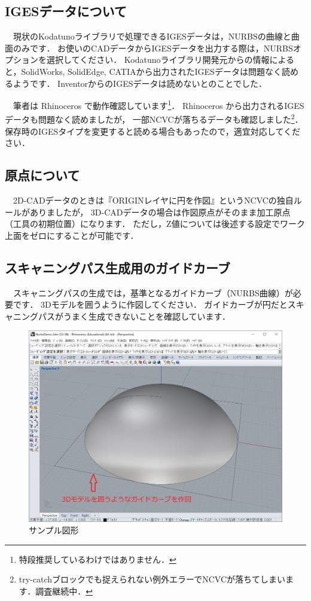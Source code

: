 
\subsection{IGESデータについて}
\label{sec:AboutIGES}
　現状のKodatunoライブラリで処理できるIGESデータは，NURBSの曲線と曲面のみです．
お使いのCADデータからIGESデータを出力する際は，NURBSオプションを選択してください．
Kodatunoライブラリ開発元からの情報によると，SolidWorks, SolidEdge, CATIAから出力されたIGESデータは問題なく読めるようです．
InventorからのIGESデータは読めないとのことでした．

　筆者は Rhinoceros で動作確認しています\footnote{特段推奨しているわけではありません．}．
Rhinoceros から出力されるIGESデータも問題なく読めましたが，
一部NCVCが落ちるデータも確認しました\footnote{try-catchブロックでも捉えられない例外エラーでNCVCが落ちてしまいます．調査継続中．}．
保存時のIGESタイプを変更すると読める場合もあったので，適宜対応してください．

\subsection{原点について}
　2D-CADデータのときは『ORIGINレイヤに円を作図』というNCVCの独自ルールがありましたが，
3D-CADデータの場合は作図原点がそのまま加工原点（工具の初期位置）になります．
ただし，Z値については後述する設定でワーク上面をゼロにすることが可能です．

\subsection{スキャニングパス生成用のガイドカーブ}
　スキャニングパスの生成では，基準となるガイドカーブ（NURBS曲線）が必要です．
3Dモデルを囲うように作図してください．
ガイドカーブが円だとスキャニングパスがうまく生成できないことを確認しています．

\begin{figure}[H]
\centering
\includegraphics[scale=0.5]{No1/fig/fig11.png}
\caption{サンプル図形}
\label{fig:sample.iges}
\end{figure}


